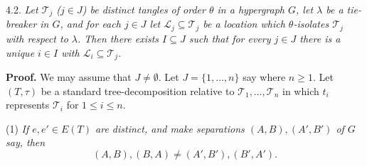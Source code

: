 4.2. \textit{Let $\mathscr{T}_j$ ($j \in J$) be distinct tangles of order $\theta$ in a hypergraph $G$, let $\lambda$ be a tie-breaker in $G$, and for each $j \in J$ let $\mathscr{L}_j \subseteq \mathscr{T}_j$ be a location which $\theta$-isolates $\mathscr{T}_j$ with respect to $\lambda$. Then there exists $I \subseteq J$ such that for every $j \in J$ there is a unique $i \in I$ with $\mathscr{L}_i \subseteq \mathscr{T}_j$.}

\textbf{Proof.} We may assume that $J \ne \emptyset$. Let $J = \{1, \dots, n\}$ say where $n \ge 1$. Let $(T, \tau)$ be a standard tree-decomposition relative to $\mathscr{T}_1, \dots, \mathscr{T}_n$ in which $t_i$ represents $\mathscr{T}_i$ for $1 \le i \le n$.

\hspace*{12pt}(1) \textit{If $e, e' \in E(T)$ are distinct, and make separations $(A, B), (A', B')$ of $G$ say, then}
\begin{equation*}
(A, B), (B, A) \ne (A', B'), (B', A').
\end{equation*}
